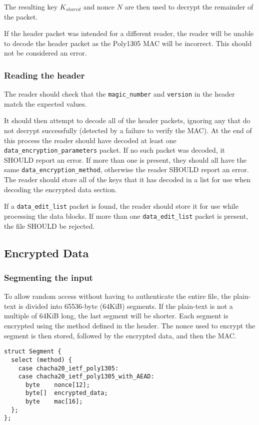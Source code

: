 \documentclass[10pt]{article}
\newcommand{\kw}[1]{\texttt{#1}}
\begin{document}
The resulting key $K_{shared}$ and nonce $N$ are then used to decrypt the remainder of the packet.

If the header packet was intended for a different reader, the reader will be unable to decode the header packet
as the Poly1305 MAC will be incorrect.
This should not be considered an error.

\subsubsection{Reading the header}

The reader should check that the \kw{magic\_number} and \kw{version} in the header match the expected values.

It should then attempt to decode all of the header packets, ignoring any that do not decrypt successfully
(detected by a failure to verify the MAC).
At the end of this process the reader should have decoded at least one \kw{data\_encryption\_parameters} packet.
If no such packet was decoded, it SHOULD report an error.
If more than one is present, they should all have the same \kw{data\_encryption\_method}, otherwise the reader
SHOULD report an error.
The reader should store all of the keys that it has decoded in a list for use when decoding the encrypted data section.

If a \kw{data\_edit\_list} packet is found, the reader should store it for use while processing the data blocks.
If more than one \kw{data\_edit\_list} packet is present, the file SHOULD be rejected.

\subsection{Encrypted Data}\label{data:encryption}
\subsubsection{Segmenting the input}

To allow random access without having to authenticate the entire file, the plain-text is divided into 65536-byte
(64KiB) segments.
If the plain-text is not a multiple of 64KiB long, the last segment will be shorter.
Each segment is encrypted using the method defined in the header.
The nonce used to encrypt the segment is then stored, followed by the encrypted data, and then the MAC.

\begin{verbatim}
struct Segment {
  select (method) {
    case chacha20_ietf_poly1305:
    case chacha20_ietf_poly1305_with_AEAD:
      byte    nonce[12];
      byte[]  encrypted_data;
      byte    mac[16];
  };
};
\end{verbatim}
\end{document}
